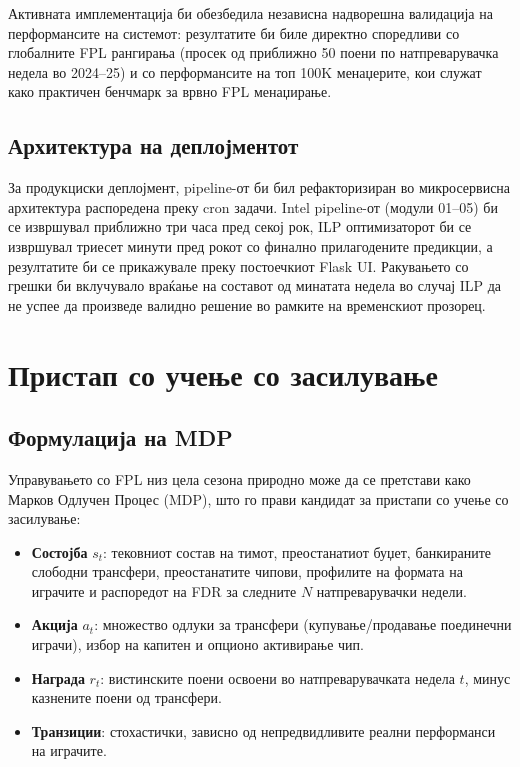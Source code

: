 Активната имплементација би обезбедила независна надворешна валидација на перформансите на системот: резултатите би биле директно споредливи со глобалните FPL рангирања (просек од приближно 50 поени по натпреварувачка недела во 2024--25) и со перформансите на топ 100K менаџерите, кои служат како практичен бенчмарк за врвно FPL менаџирање.

\subsection{Архитектура на деплојментот}

За продукциски деплојмент, pipeline-от би бил рефакторизиран во микросервисна архитектура распоредена преку cron задачи. Intel pipeline-от (модули 01--05) би се извршувал приближно три часа пред секој рок, ILP оптимизаторот би се извршувал триесет минути пред рокот со финално прилагодените предикции, а резултатите би се прикажувале преку постоечкиот Flask UI. Ракувањето со грешки би вклучувало враќање на составот од минатата недела во случај ILP да не успее да произведе валидно решение во рамките на временскиот прозорец.

\section{Пристап со учење со засилување}

\subsection{Формулација на MDP}

Управувањето со FPL низ цела сезона природно може да се претстави како Марков Одлучен Процес (MDP), што го прави кандидат за пристапи со учење со засилување:

\begin{itemize}
  \item \textbf{Состојба} $s_t$: тековниот состав на тимот, преостанатиот буџет, банкираните слободни трансфери, преостанатите чипови, профилите на формата на играчите и распоредот на FDR за следните $N$ натпреварувачки недели.
  \item \textbf{Акција} $a_t$: множество одлуки за трансфери (купување/продавање поединечни играчи), избор на капитен и опционо активирање чип.
  \item \textbf{Награда} $r_t$: вистинските поени освоени во натпреварувачката недела $t$, минус казнените поени од трансфери.
  \item \textbf{Транзиции}: стохастички, зависно од непредвидливите реални перформанси на играчите.
\end{itemize}

